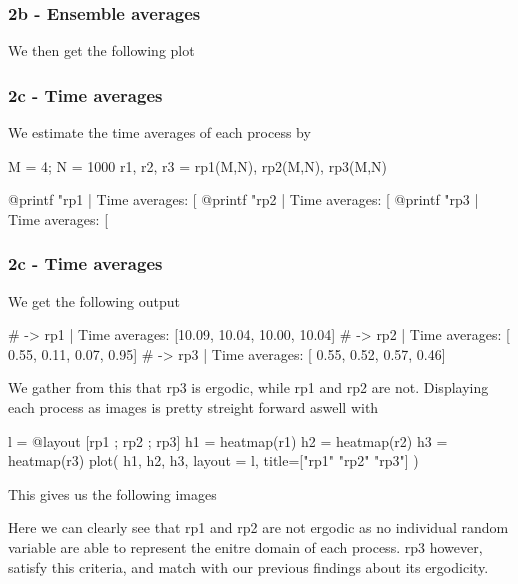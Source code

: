 \documentclass[compress]{beamer}
\begin{document}
\begin{frame}
    \frametitle{2b - Ensemble averages}
    We then get the following plot
    \begin{figure}
        
    \end{figure}
\end{frame}

\begin{frame}[fragile]
    \frametitle{2c - Time averages}
    We estimate the time averages of each process by
    \begin{jllisting}[gobble=8]
        M = 4; N = 1000
        r1, r2, r3 = rp1(M,N), rp2(M,N), rp3(M,N)

        @printf "rp1 | Time averages: [%
        @printf "rp2 | Time averages: [%
        @printf "rp3 | Time averages: [%
    \end{jllisting}
\end{frame}

\begin{frame}[fragile]
    \frametitle{2c - Time averages}
    We get the following output
    \begin{jllisting}[gobble=8]
        # -> rp1 | Time averages: [10.09, 10.04, 10.00, 10.04]
        # -> rp2 | Time averages: [ 0.55,  0.11,  0.07,  0.95]
        # -> rp3 | Time averages: [ 0.55,  0.52,  0.57,  0.46]
    \end{jllisting}
    We gather from this that rp3 is ergodic, while rp1 and rp2 are not.
    \pause
    Displaying each process as images is pretty streight forward aswell with
    \begin{jllisting}[gobble=8]
        l = @layout [rp1 ; rp2 ; rp3]
        h1 = heatmap(r1)
        h2 = heatmap(r2)
        h3 = heatmap(r3)
        plot(
            h1, h2, h3, layout = l,
            title=["rp1" "rp2" "rp3"]
        )
    \end{jllisting}
\end{frame}

\begin{frame}
    This gives us the following images
    \begin{figure}
        
    \end{figure}
    \pause
    Here we can clearly see that rp1 and rp2 are not ergodic as no individual
    random variable are able to represent the enitre domain of each process.
    rp3 however, satisfy this criteria, and match with our previous findings
    about its ergodicity.
\end{frame}
\end{document}
